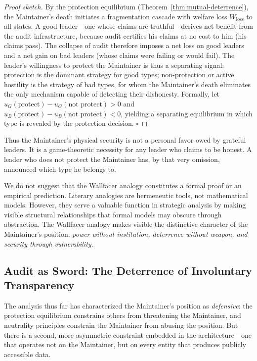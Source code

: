 \documentclass[12pt,a4paper]{article}
\theoremstyle{definition}
\theoremstyle{remark}
\begin{document}
\begin{proof}[Proof sketch]
By the protection equilibrium (Theorem~\ref{thm:mutual-deterrence}), the Maintainer's death initiates a fragmentation cascade with welfare loss $W_{\text{loss}}$ to all states. A good leader—one whose claims are truthful—derives net benefit from the audit infrastructure, because audit certifies his claims at no cost to him (his claims pass). The collapse of audit therefore imposes a net loss on good leaders and a net gain on bad leaders (whose claims were failing or would fail). The leader's willingness to protect the Maintainer is thus a separating signal: protection is the dominant strategy for good types; non-protection or active hostility is the strategy of bad types, for whom the Maintainer's death eliminates the only mechanism capable of detecting their dishonesty. Formally, let $u_G(\text{protect}) - u_G(\text{not protect}) > 0$ and $u_B(\text{protect}) - u_B(\text{not protect}) < 0$, yielding a separating equilibrium in which type is revealed by the protection decision. $\square$
\end{proof}

Thus the Maintainer's physical security is not a personal favor owed by grateful leaders. It is a game-theoretic necessity for any leader who claims to be honest. A leader who does not protect the Maintainer has, by that very omission, announced which type he belongs to.

We do not suggest that the Wallfacer analogy constitutes a formal proof or an empirical prediction. Literary analogies are hermeneutic tools, not mathematical models. However, they serve a valuable function in strategic analysis by making visible structural relationships that formal models may obscure through abstraction. The Wallfacer analogy makes visible the distinctive character of the Maintainer's position: \textit{power without institution, deterrence without weapon, and security through vulnerability}.

\subsection{Audit as Sword: The Deterrence of Involuntary Transparency}

The analysis thus far has characterized the Maintainer's position as \textit{defensive}: the protection equilibrium constrains others from threatening the Maintainer, and neutrality principles constrain the Maintainer from abusing the position. But there is a second, more asymmetric constraint embedded in the architecture—one that operates not on the Maintainer, but on every entity that produces publicly accessible data.
\end{document}
